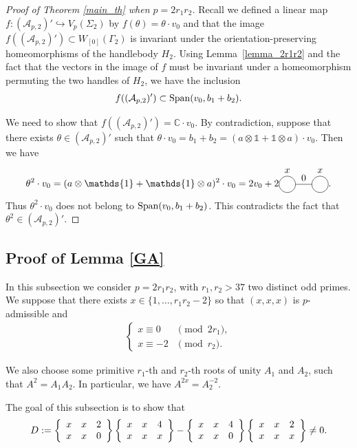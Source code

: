 \documentclass[pdftex]{sigma}
\numberwithin{equation}{section}
\begin{document}
\begin{proof}[Proof of Theorem \ref{main_th} when $p=2r_1r_2$]
Recall we defined a linear map $f\colon (\mathcal{A}_{p,2})' \hookrightarrow V_p(\Sigma_2)$ by $f(\theta)=\theta\cdot v_0$ and that the image $f\left( (\mathcal{A}_{p,2})' \right) \subset W_{[0]}(\Gamma_2)$ is invariant under the orientation-preserving homeomorphisms of the handlebody $H_2$. Using Lemma~\ref{lemma_2r1r2} and the fact that the vectors in the image of $f$ must be invariant under a homeomorphism permuting the two handles of $H_2$, we have the inclusion
\begin{gather*} f ( (\mathcal{A}_{p,2})' ) \subset \operatorname{Span} ( v_0, b_1+b_2 ).\end{gather*}

We need to show that $f( (\mathcal{A}_{p,2})' )= \mathbb{C}\cdot v_0$. By contradiction, suppose that there exists $\theta \in (\mathcal{A}_{p,2})'$ such that $\theta \cdot v_0 = b_1+b_2= (a\otimes \mathds{1} + \mathds{1}\otimes a) \cdot v_0$. Then we have
\begin{gather*}
\theta ^2 \cdot v_0 =( a \otimes \mathds{1} + \mathds{1}\otimes a )^2\cdot v_0= 2 v_0 + 2\eyesgraph{$x$}{0}{$x$}.
\end{gather*}
Thus $\theta^2\cdot v_0$ does not belong to $ \operatorname{Span} ( v_0, b_1+b_2 ) $. This contradicts the fact that $\theta^2 \in (\mathcal{A}_{p,2})'$.
\end{proof}

\subsection{Proof of Lemma \ref{GA}}

In this subsection we consider $p=2r_1r_2$, with $r_1, r_2>37$ two distinct odd primes. We suppose that there exists $x\in\{1,\ldots, r_1r_2-2\}$ so that $(x,x,x)$ is $p$-admissible and
\begin{gather*}\begin{cases}
x\equiv 0 & \pmod{2r_1}, \\
x\equiv -2 & \pmod{r_2}.
\end{cases}
\end{gather*}

We also choose some primitive $r_1$-{th} and $r_2$-{th} roots of unity $A_1$ and $A_2$, such that $A^2=A_1A_2$. In particular, we have $A^{2x}=A_2^{-2}$.

The goal of this subsection is to show that
\begin{gather*} D:= \left\{ \begin{array}{ccc} x & x & 2 \\ x & x & 0 \end{array} \right\}\left\{ \begin{array}{ccc} x & x & 4 \\ x & x & x \end{array} \right\} - \left\{ \begin{array}{ccc} x & x & 4 \\ x & x & 0 \end{array} \right\}\left\{ \begin{array}{ccc} x & x & 2 \\ x & x & x \end{array} \right\} \neq 0.\end{gather*}
\end{document}
